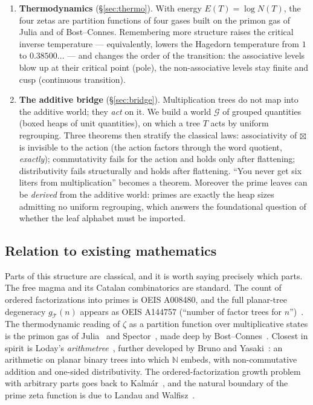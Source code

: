 \documentclass[11pt]{article}
\newcommand{\cT}{\mathcal{T}}   %
\newcommand{\cG}{\mathcal{G}}   %
\newcommand{\NN}{\mathbb{N}}
\numberwithin{equation}{section}
\theoremstyle{plain}
\theoremstyle{definition}
\theoremstyle{remark}
\begin{document}
\begin{enumerate}
\item \textbf{Thermodynamics} (\S\ref{sec:thermo}). With energy $E(T) = \log N(T)$, the
four zetas are partition functions of four gases built on the primon gas of Julia and of
Bost--Connes. Remembering more structure raises the critical inverse temperature ---
equivalently, lowers the Hagedorn temperature from $1$ to $0.38500\dots$ --- and changes
the order of the transition: the associative levels blow up at their critical point
(pole), the non-associative levels stay finite and cusp (continuous transition).

\item \textbf{The additive bridge} (\S\ref{sec:bridge}). Multiplication trees do not map
into the additive world; they \emph{act} on it. We build a world $\cG$ of grouped
quantities (boxed heaps of unit quantities), on which a tree $T$ acts by uniform
regrouping. Three theorems then stratify the classical laws:
associativity of $\boxtimes$ is invisible to the action (the action factors through the
word quotient, \emph{exactly}); commutativity fails for the action and holds only after
flattening; distributivity fails structurally and holds after flattening. ``You never
get six liters from multiplication'' becomes a theorem. Moreover the prime leaves can be
\emph{derived} from the additive world: primes are exactly the heap sizes admitting no
uniform regrouping, which answers the foundational question of whether the leaf alphabet
must be imported.
\end{enumerate}

\subsection{Relation to existing mathematics}\label{sec:priorart}

Parts of this structure are classical, and it is worth saying precisely which parts.
The free magma and its Catalan combinatorics are standard. The count of ordered
factorizations into primes is OEIS A008480, and the full planar-tree degeneracy
$g_\cT(n)$ appears as OEIS A144757 (``number of factor trees for $n$'')~\cite{oeis}. The
thermodynamic reading of $\zeta$ as a partition function over multiplicative states is
the primon gas of Julia~\cite{julia} and Spector~\cite{spector}, made deep by
Bost--Connes~\cite{bostconnes}. Closest in spirit is Loday's
\emph{arithmetree}~\cite{loday}, further developed by Bruno and
Yasaki~\cite{brunoyasaki}: an arithmetic on planar binary trees into which $\NN$ embeds,
with non-commutative addition and one-sided distributivity. The ordered-factorization
growth problem with arbitrary parts goes back to Kalm\'ar~\cite{kalmar}, and the natural
boundary of the prime zeta function is due to Landau and Walfisz~\cite{landauwalfisz}.
\end{document}
